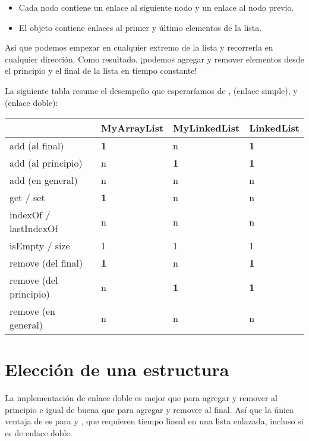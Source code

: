 \documentclass[12pt]{book}
\theoremstyle{exercise}
\begin{document}
\begin{itemize}
\item
  Cada nodo contiene un enlace al siguiente nodo y un enlace al nodo
  previo.

\item
  El objeto  contiene enlaces al primer y último
  elementos de la lista.

\end{itemize}

Así que podemos empezar en cualquier extremo de la lista y recorrerla
en cualquier dirección. Como resultado, ¡podemos agregar y remover
elementos desde el principio y el final de la lista en tiempo constante!


La siguiente tabla resume el desempeño que esperaríamos de
,  (enlace simple), y
 (enlace doble):

\begin{tabular}[c]{@{}llll@{}}
\hline
& MyArrayList & MyLinkedList & LinkedList
\\
\hline
add (al final) & \textbf{1} & n & \textbf{1}
\\
add (al principio) & n & \textbf{1} & \textbf{1}
\\
add (en general) & n & n & n
\\
get / set & \textbf{1} & n & n
\\
indexOf / lastIndexOf & n & n & n
\\
isEmpty / size & 1 & 1 & 1
\\
remove (del final) & \textbf{1} & n & \textbf{1}
\\
remove (del principio) & n & \textbf{1} & \textbf{1}
\\
remove (en general) & n & n & n
\\
\hline
\end{tabular}


\section{Elección de una estructura}

La implementación de enlace doble es mejor que  para
agregar y remover al principio e igual de buena que
 para agregar y remover al final. Así que la única
ventaja de  es para  y ,
que requieren tiempo lineal en una lista enlazada, incluso si es de enlace doble.
\end{document}
